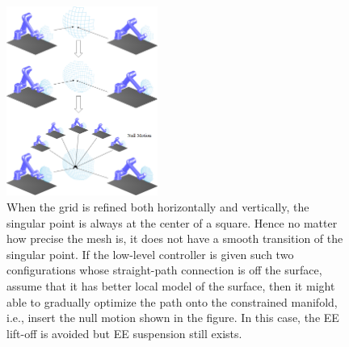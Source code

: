\documentclass[Afour,sageh,times]{sagej}
\begin{document}
\begin{figure}[t]
\centering
\includegraphics[width = 0.44\textwidth]{figures/exp_central_sphere/pass_to_controller}
\caption{
When the grid is refined both horizontally and vertically, the singular point is always at the center of a square. Hence no matter how precise the mesh is, it does not have a smooth transition of the singular point.  
If the low-level controller is given such two configurations whose straight-path connection is off the surface, assume that it has better local model of the surface, then it might able to gradually optimize the path onto the constrained manifold, i.e., insert the null motion shown in the figure. In this case, the EE lift-off is avoided but EE suspension still exists.}\label{fig:bad_mesh}
\end{figure}


\end{document}
